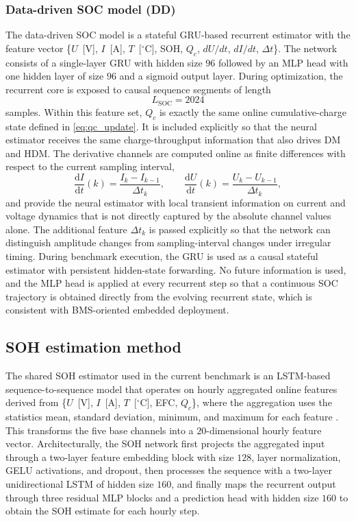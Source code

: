\documentclass[review]{elsarticle}
\begin{document}
\subsubsection{Data-driven SOC model (DD)}
The data-driven SOC model is a stateful GRU-based recurrent estimator with the feature vector \{$U$~[V], $I$~[A], $T$~[$^\circ$C], SOH, $Q_c$, $dU/dt$, $dI/dt$, $\Delta t$\}. The network consists of a single-layer GRU with hidden size $96$ followed by an MLP head with one hidden layer of size $96$ and a sigmoid output layer. During optimization, the recurrent core is exposed to causal sequence segments of length
\begin{equation}
    L_{\mathrm{SOC}} = 2024
\end{equation}
samples. Within this feature set, $Q_c$ is exactly the same online cumulative-charge state defined in \eqref{eq:qc_update}. It is included explicitly so that the neural estimator receives the same charge-throughput information that also drives DM and HDM. The derivative channels are computed online as finite differences with respect to the current sampling interval,
\begin{equation}
    \frac{\mathrm{d}I}{\mathrm{d}t}(k)=\frac{I_k-I_{k-1}}{\Delta t_k},
    \qquad
    \frac{\mathrm{d}U}{\mathrm{d}t}(k)=\frac{U_k-U_{k-1}}{\Delta t_k},
    \label{eq:derivative_features}
\end{equation}
and provide the neural estimator with local transient information on current and voltage dynamics that is not directly captured by the absolute channel values alone. The additional feature $\Delta t_k$ is passed explicitly so that the network can distinguish amplitude changes from sampling-interval changes under irregular timing. During benchmark execution, the GRU is used as a causal stateful estimator with persistent hidden-state forwarding. No future information is used, and the MLP head is applied at every recurrent step so that a continuous SOC trajectory is obtained directly from the evolving recurrent state, which is consistent with BMS-oriented embedded deployment.

\subsection{SOH estimation method}
The shared SOH estimator used in the current benchmark is an LSTM-based sequence-to-sequence model that operates on hourly aggregated online features derived from \{$U$~[V], $I$~[A], $T$~[$^\circ$C], EFC, $Q_c$\}, where the aggregation uses the statistics mean, standard deviation, minimum, and maximum for each feature \cite{Embedded_AI_SOH_badData,gouEnsembleLearningBasedDataDriven2021,liOnlineCapacityEstimation2021,rzepkaNeuralNetworkArchitecture2023a}. This transforms the five base channels into a $20$-dimensional hourly feature vector. Architecturally, the SOH network first projects the aggregated input through a two-layer feature embedding block with size $128$, layer normalization, GELU activations, and dropout, then processes the sequence with a two-layer unidirectional LSTM of hidden size $160$, and finally maps the recurrent output through three residual MLP blocks and a prediction head with hidden size $160$ to obtain the SOH estimate for each hourly step.
\end{document}
